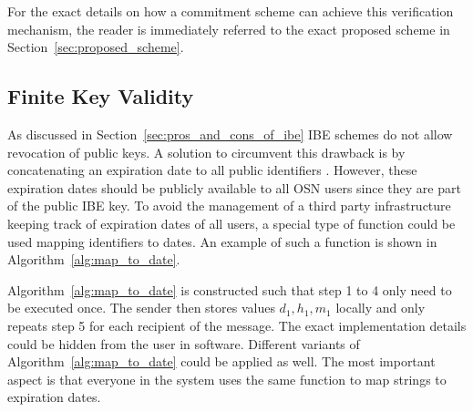 For the exact details on how a commitment scheme can achieve this verification mechanism, the reader is immediately referred to the exact proposed scheme in Section~\ref{sec:proposed_scheme}.

\subsection{Finite Key Validity}
As discussed in Section~\ref{sec:pros_and_cons_of_ibe} IBE schemes do not allow revocation of public keys. A solution to circumvent this drawback is by concatenating an expiration date to all public identifiers \id{}. However, these expiration dates should be publicly available to all OSN users since they are part of the public IBE key. To avoid the management of a third party infrastructure keeping track of expiration dates of all users, a special type of function could be used mapping identifiers \id{} to dates. An example of such a function is shown in Algorithm~\ref{alg:map_to_date}.

Algorithm~\ref{alg:map_to_date} is constructed such that step 1 to 4 only need to be executed once. The sender then stores values $d_1, h_1, m_1$ locally and only repeats step 5 for each recipient of the message. The exact implementation details could be hidden from the user in software. Different variants of Algorithm~\ref{alg:map_to_date} could be applied as well. The most important aspect is that everyone in the system uses the same function to map strings to expiration dates.


